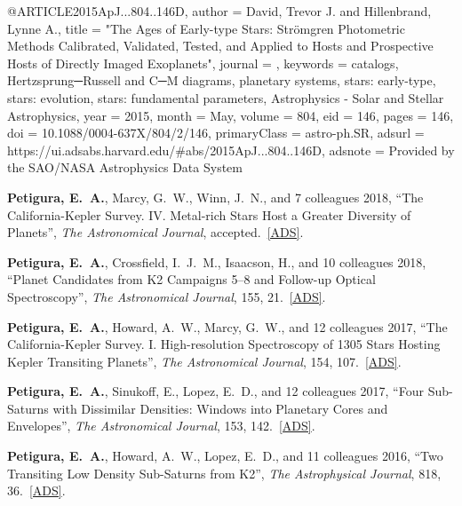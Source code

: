 @ARTICLE{2015ApJ...804..146D,
       author = {{David}, Trevor J. and {Hillenbrand}, Lynne A.},
        title = "{The Ages of Early-type Stars: Str{\"o}mgren Photometric Methods
        Calibrated, Validated, Tested, and Applied to Hosts and
        Prospective Hosts of Directly Imaged Exoplanets}",
      journal = {\apj},
     keywords = {catalogs, Hertzsprung─Russell and C─M diagrams, planetary systems,
        stars: early-type, stars: evolution, stars: fundamental
        parameters, Astrophysics - Solar and Stellar Astrophysics},
         year = 2015,
        month = May,
       volume = {804},
          eid = {146},
        pages = {146},
          doi = {10.1088/0004-637X/804/2/146},
 primaryClass = {astro-ph.SR},
       adsurl = {https://ui.adsabs.harvard.edu/#abs/2015ApJ...804..146D},
      adsnote = {Provided by the SAO/NASA Astrophysics Data System}
}
\fi 




\iffalse
\item {\bf {\bf Petigura, E.}~A.}, Marcy, G.~W., Winn, J.~N., and 7 colleagues 2018,  
``The California-Kepler Survey. IV. Metal-rich Stars Host a Greater 
Diversity of Planets'', {\it The Astronomical Journal}, accepted.\  
\href{http://adsabs.harvard.edu/abs/2017arXiv171204042P}{[ADS]}. 


\item {\bf {\bf Petigura, E.}~A.}, Crossfield, I.~J.~M., Isaacson, H., and 10 
colleagues 2018,  ``Planet Candidates from K2 Campaigns 5--8 and 
Follow-up Optical Spectroscopy'', {\it The Astronomical Journal}, 155,  
21.\  \href{http://adsabs.harvard.edu/abs/2018AJ....155...21P}{[ADS]}. 


\item {\bf {\bf Petigura, E.}~A.}, Howard, A.~W., Marcy, G.~W., and 12 colleagues 2017,  
``The California-Kepler Survey. I. High-resolution Spectroscopy of 1305 
Stars Hosting Kepler Transiting Planets'', {\it The Astronomical Journal}, 
154,  107.\  
\href{http://adsabs.harvard.edu/abs/2017AJ....154..107P}{[ADS]}. 


\item {\bf {\bf Petigura, E.}~A.}, Sinukoff, E., Lopez, E.~D., and 12 colleagues 2017,  
``Four Sub-Saturns with Dissimilar Densities: Windows into Planetary Cores 
and Envelopes'', {\it The Astronomical Journal}, 153,  142.\  
\href{http://adsabs.harvard.edu/abs/2017AJ....153..142P}{[ADS]}. 


\item {\bf {\bf Petigura, E.}~A.}, Howard, A.~W., Lopez, E.~D., and 11 colleagues 2016,  
``Two Transiting Low Density Sub-Saturns from K2'', {\it The Astrophysical 
Journal}, 818,  36.\  
\href{http://adsabs.harvard.edu/abs/2016ApJ...818...36P}{[ADS]}. 


